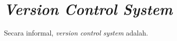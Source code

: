 \section{\textit{Version Control System}}
Secara informal, \textit{version control system} adalah.


